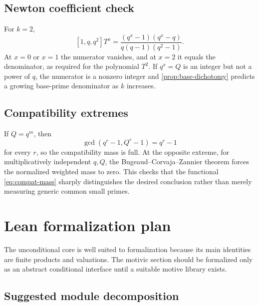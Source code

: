 \documentclass[11pt]{article}
\theoremstyle{definition}
\theoremstyle{remark}
\begin{document}
\subsection{Newton coefficient check}

For $k=2$,
\[
 [1,q,q^2]T^x
 =\frac{(q^x-1)(q^x-q)}{q(q-1)(q^2-1)}.
\]
At $x=0$ or $x=1$ the numerator vanishes, and at $x=2$ it equals the
denominator, as required for the polynomial $T^2$.  If $q^x=Q$ is an integer
but not a power of $q$, the numerator is a nonzero integer and
\cref{prop:base-dichotomy} predicts a growing base-prime denominator as $k$
increases.

\subsection{Compatibility extremes}

If $Q=q^m$, then
\[
 \gcd(q^r-1,Q^r-1)=q^r-1
\]
for every $r$, so the compatibility mass is full.  At the opposite extreme,
for multiplicatively independent $q,Q$, the Bugeaud--Corvaja--Zannier theorem
forces the normalized weighted mass to zero.  This checks that the functional
\eqref{eq:compat-mass} sharply distinguishes the desired conclusion rather
than merely measuring generic common small primes.

\section{Lean formalization plan}

The unconditional core is well suited to formalization because its main
identities are finite products and valuations.  The motivic section should be
formalized only as an abstract conditional interface until a suitable motive
library exists.

\subsection{Suggested module decomposition}
\end{document}
